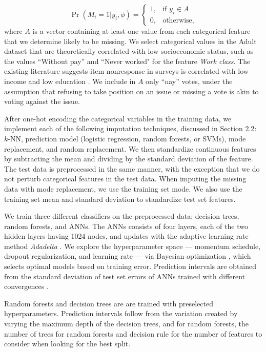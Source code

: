 \documentclass[10pt]{book}
\theoremstyle{definition}
\begin{document}
 \begin{equation}\label{3.1}
\Pr (M_i = 1 | y_i, \phi) = \begin{cases}
1, &\text{if $y_i \in A$}  \\
0, &\text{otherwise},
\end{cases}
\end{equation} where $A$ is a vector containing at least one value from each categorical feature that we determine likely to be missing. We select categorical values in the Adult dataset that are theoretically correlated with low socioeconomic status, such as the values ``Without pay'' and ``Never worked" for the feature \emph{Work class}. The existing literature suggests item nonresponse in surveys is correlated with low income and low education \citep{rubin1995}. We include in $A$ only ``nay'' votes, under the assumption that refusing to take position on an issue or missing a vote is akin to voting against the issue. 
\nocite{rubin1995}

After one-hot encoding the categorical variables in the training data, we implement each of the following imputation techniques, discussed in Section 2.2: $k$-NN, prediction model (logistic regression, random forests, or SVMs), mode replacement, and random replacement. We then standardize continuous features by subtracting the mean and dividing by the standard deviation of the feature. The test data is preprocessed in the same manner, with the exception that we do not perturb categorical features in the test data. When imputing the missing data with mode replacement, we use the training set mode. We also use the training set mean and standard deviation to standardize test set features.

\par
{}

We train three different classifiers on the preprocessed data: decision trees, random forests, and ANNs. The ANNs consists of four layers, each of the two hidden layers having 1024 nodes, and updates with the adaptive learning rate method \emph{Adadelta} \citep{zeiler2012}. We explore the hyperparameter space ---  momentum schedule, dropout regularization, and learning rate --- via Bayesian optimization \citep{snoek2012}, which selects optimal models based on training error. Prediction intervals are obtained from the standard deviation of test set errors of ANNs trained with different convergences \citep{heskes1997}. 

Random forests and decision trees are are trained with preselected hyperparameters. Prediction intervals follow from the variation created by varying the maximum depth of the decision trees, and for random forests, the number of trees for random forests and decision rule for the number of features to consider when looking for the best split. 
\end{document}
